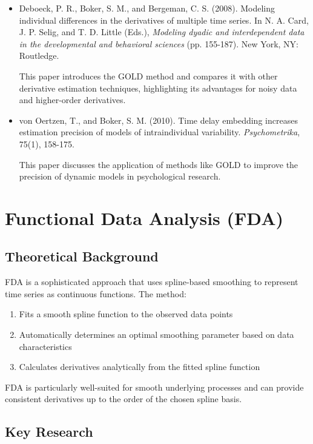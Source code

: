 \documentclass{article}
\begin{document}
\begin{itemize}
    \item Deboeck, P. R., Boker, S. M., and Bergeman, C. S. (2008). Modeling individual differences in the derivatives of multiple time series. In N. A. Card, J. P. Selig, and T. D. Little (Eds.), \textit{Modeling dyadic and interdependent data in the developmental and behavioral sciences} (pp. 155-187). New York, NY: Routledge.
    
    This paper introduces the GOLD method and compares it with other derivative estimation techniques, highlighting its advantages for noisy data and higher-order derivatives.
    
    \item von Oertzen, T., and Boker, S. M. (2010). Time delay embedding increases estimation precision of models of intraindividual variability. \textit{Psychometrika}, 75(1), 158-175.
    
    This paper discusses the application of methods like GOLD to improve the precision of dynamic models in psychological research.
\end{itemize}

\section{Functional Data Analysis (FDA)}

\subsection{Theoretical Background}

FDA is a sophisticated approach that uses spline-based smoothing to represent time series as continuous functions. The method:

\begin{enumerate}
    \item Fits a smooth spline function to the observed data points
    \item Automatically determines an optimal smoothing parameter based on data characteristics
    \item Calculates derivatives analytically from the fitted spline function
\end{enumerate}

FDA is particularly well-suited for smooth underlying processes and can provide consistent derivatives up to the order of the chosen spline basis.

\subsection{Key Research}
\end{document}
